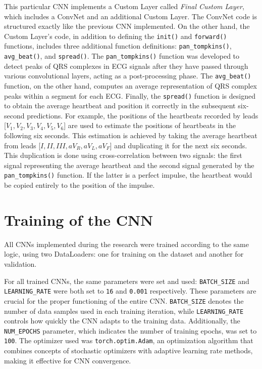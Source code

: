 \documentclass[12pt,english]{report}
\begin{document}
This particular CNN implements a Custom Layer called \textit{Final Custom Layer}, which includes a ConvNet and an additional Custom Layer. The ConvNet code is structured exactly like the previous CNN implemented. On the other hand, the Custom Layer's code, in addition to defining the \texttt{init()} and \texttt{forward()} functions, includes three additional function definitions: \texttt{pan\_tompkins()}, \texttt{avg\_beat()}, and \texttt{spread()}. The \texttt{pan\_tompkins()} function was developed to detect peaks of QRS complexes in ECG signals after they have passed through various convolutional layers, acting as a post-processing phase. The \texttt{avg\_beat()} function, on the other hand, computes an average representation of QRS complex peaks within a segment for each ECG. Finally, the \texttt{spread()} function is designed to obtain the average heartbeat and position it correctly in the subsequent six-second predictions. For example, the positions of the heartbeats recorded by leads [$ V_{1}, V_{2}, V_{3}, V_{4}, V_{5}, V_{6} $] are used to estimate the positions of heartbeats in the following six seconds. This estimation is achieved by taking the average heartbeat from leads [$ I, II, III, aV_{R}, aV_{L}, aV_{F} $] and duplicating it for the next six seconds. This duplication is done using cross-correlation between two signals: the first signal representing the average heartbeat and the second signal generated by the \texttt{pan\_tompkins()} function. If the latter is a perfect impulse, the heartbeat would be copied entirely to the position of the impulse.

\section{Training of the CNN}
\label{sec:addestramento}

All CNNs implemented during the research were trained according to the same logic, using two DataLoaders: one for training on the dataset and another for validation.

For all trained CNNs, the same parameters were set and used: \texttt{BATCH\_SIZE} and \texttt{LEARNING\_RATE} were both set to \texttt{16} and \texttt{0.001} respectively. These parameters are crucial for the proper functioning of the entire CNN. \texttt{BATCH\_SIZE} denotes the number of data samples used in each training iteration, while \texttt{LEARNING\_RATE} controls how quickly the CNN adapts to the training data. Additionally, the \texttt{NUM\_EPOCHS} parameter, which indicates the number of training epochs, was set to \texttt{100}. The optimizer used was \texttt{torch.optim.Adam}, an optimization algorithm that combines concepts of stochastic optimizers with adaptive learning rate methods, making it effective for CNN convergence.
\end{document}
